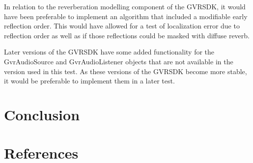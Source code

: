 \documentclass[paper=a4, fontsize=10pt, font=arial]{scrartcl} %
\numberwithin{equation}{section} %
\numberwithin{figure}{section} %
\numberwithin{table}{section} %
\begin{document}
In relation to the reverberation modelling component of the GVRSDK, it would have been preferable to implement an algorithm that included a modifiable early reflection order. This would have allowed for a test of localization error due to reflection order as well as if those reflections could be masked with diffuse reverb.

Later versions of the GVRSDK have some added functionality for the GvrAudioSource and GvrAudioListener objects that are not available in the version used in this test. As these versions of the GVRSDK become more stable, it would be preferable to implement them in a later test. 

\section{Conclusion}


\newpage
\section{References}

{}

\end{document}
